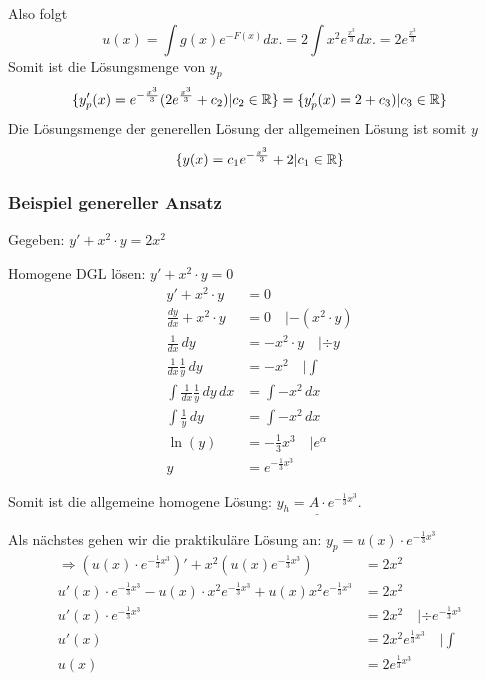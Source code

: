 
Also folgt\[
u(x) = \int  g(x)e^{-F(x)} dx. =  2 \int  x^2e^{\frac{x^3}{3}} dx. = 2e^{\frac{x^3}{3}}
\]
Somit ist die Lösungsmenge von $y_p$
\[
\{ y_p'(x) = e^{-\frac{x^3}{3}} (2e^{\frac{x^3}{3}} + c_2) | c_2 \in \mathbb{R} \}
= \{ y_p'(x) =2 + c_3) | c_3 \in \mathbb{R} \}
\]
Die Lösungsmenge der generellen Lösung der allgemeinen Lösung ist somit $y$\[
\{ y(x) =  c_1e^{-\frac{x^3}{3}} +  2  | c_1 \in \mathbb{R} \}
\]

\subsubsection{Beispiel genereller Ansatz}
Gegeben: $y' + x^2 \cdot y = 2x^2$

Homogene DGL lösen: $y' + x^2 \cdot y = 0$
\begin{align*}
y' + x^2 \cdot y &= 0\\
\frac{dy}{dx} + x^2 \cdot y &= 0 \quad | -(x^2 \cdot y)\\
\frac{1}{dx}\, dy &= -x^2 \cdot y \quad | \div y\\
\frac{1}{dx} \frac{1}{y} \, dy &= -x^2 \quad | \int\\
\int \frac{1}{dx} \frac{1}{y} \, dy \, dx &= \int -x^2 \, dx\\
\int \frac{1}{y}\, dy &= \int -x^2 \, dx\\
\ln(y) &= -\frac{1}{3} x^3 \quad | e^\alpha\\
y &= e^{-\frac{1}{3}x^3}
\end{align*}

Somit ist die allgemeine homogene Lösung: $\underline{y_h = A \cdot e^{-\frac{1}{3}x^3}}$.


Als nächstes gehen wir die praktikuläre Lösung an:
$y_p = u(x) \cdot e^{-\frac{1}{3}x^3}$
\begin{align*}
\Rightarrow (u(x) \cdot e^{-\frac{1}{3}x^3})' + x^2 (u(x) e^{-\frac{1}{3}x^3}) &= 2 x^2\\
u'(x) \cdot e^{-\frac{1}{3}x^3} - u(x) \cdot x^2 e^{-\frac{1}{3}x^3} + u(x) x^2 e^{-\frac{1}{3}x^3} &= 2 x^2\\
u'(x) \cdot e^{-\frac{1}{3}x^3} &= 2 x^2 \quad | \div e^{-\frac{1}{3}x^3}\\
u'(x) &= 2 x^2 e^{\frac{1}{3}x^3} \quad | \int\\
u(x) &= 2 e^{\frac{1}{3}x^3}
\end{align*}

